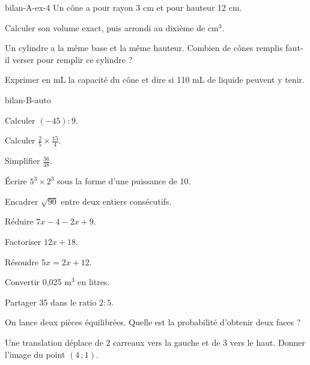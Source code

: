 \begin{blocEdition}{bilan-A-ex-4}
Un cône a pour rayon 3 cm et pour hauteur 12 cm.\begin{questions}
\item Calculer son volume exact, puis arrondi au dixième de cm$^3$.
\item Un cylindre a la même base et la même hauteur. Combien de cônes remplis faut-il verser pour remplir ce cylindre ?
\item Exprimer en mL la capacité du cône et dire si 110 mL de liquide peuvent y tenir.
\end{questions}\label{fig-bilan-A-ex-4}
\par{}\par\par{}\par{}\par{}\par{}\par{}\par{}
\end{blocEdition}
\begin{blocEdition}{bilan-B-auto}
\begin{questions}
\item Calculer $(-45):9$.
\item Calculer $\frac25\times\frac{15}{4}$.
\item Simplifier $\frac{36}{48}$.
\item Écrire $5^3\times2^3$ sous la forme d’une puissance de 10.
\item Encadrer $\sqrt{90}$ entre deux entiers consécutifs.
\item Réduire $7x-4-2x+9$.
\item Factoriser $12x+18$.
\item Résoudre $5x=2x+12$.
\item Convertir 0,025 m$^3$ en litres.
\item Partager 35 dans le ratio $2:5$.
\item On lance deux pièces équilibrées. Quelle est la probabilité d’obtenir deux faces ?
\item Une translation déplace de 2 carreaux vers la gauche et de 3 vers le haut. Donner l’image du point $(4\,;1)$.\end{questions}
\end{blocEdition}
